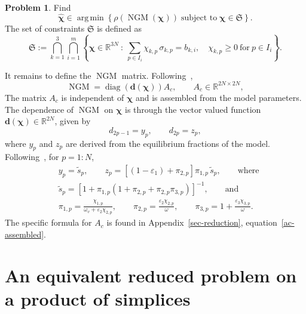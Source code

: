 \documentclass[11pt]{article}
\theoremstyle{plain}
\theoremstyle{definition}
\newtheorem{problem}[theorem]{Problem}
\theoremstyle{remark}
\numberwithin{equation}{section}
\numberwithin{figure}{section}
\numberwithin{table}{section}
\numberwithin{algorithm}{section}
\begin{document}
\begin{problem}\label{ngm-problem}
Find
\begin{equation}\label{the-min}
\widehat{\bm\chi}\in\operatorname*{arg\,min}\left\{\rho\left(\operatorname{NGM}(\bm\chi)\right)\;\mbox{subject to}\;\bm\chi\in\mathfrak{S}\right\}.
\end{equation}
The set of constraints $\mathfrak{S}$ is defined as
\begin{equation}\label{constraints}
\mathfrak{S}:=\bigcap_{k=1}^{3}\bigcap_{i=1}^{m}\left\{\bm\chi\in\mathbb{R}^{3N}\ :\
\sum_{p\in I_i}\chi_{k,p}\,\sigma_{k,p}=b_{k,i},\quad \chi_{k,p}\ge 0\ \mbox{for}\ p\in I_i\right\}.
\end{equation}
\end{problem}

It remains to define the $\operatorname{NGM}$ matrix.
Following~\cite{JZh},
\begin{equation}\label{ngm}
\operatorname{NGM}=\operatorname{diag}\left(\bm d(\bm\chi)\right)A_c,
\qquad A_c\in\mathbb{R}^{2N\times 2N},
\end{equation}
The matrix $A_c$ is independent of $\bm\chi$ and is assembled from the model parameters.
The dependence of $\operatorname{NGM}$ on $\bm\chi$ is through the vector
valued function $\bm d(\bm\chi)\in\mathbb{R}^{2N}$, given by
\begin{equation}\label{yz}
d_{2p-1}=y_p,\qquad d_{2p}=z_p,
\end{equation}
where $y_p$ and $z_p$ are derived from the equilibrium fractions of the
model. Following~\cite{JZh}, for $p=1:N$,
\begin{equation}\label{yz-def}
\begin{aligned}
&y_p=\widetilde s_p,\qquad
z_p=\left\lbrack(1-\varepsilon_1)+\pi_{2,p}\right\rbrack\pi_{1,p}\,\widetilde s_p,
\qquad\mbox{where}\\
&\widetilde s_p=\left\lbrack
1+\pi_{1,p}\left(1+\pi_{2,p}+\pi_{2,p}\pi_{3,p}\right)\right\rbrack^{-1},
\qquad\mbox{and}\\
&\pi_{1,p}=\frac{\chi_{1,p}}{\omega_v+\varepsilon_2\chi_{2,p}},\qquad
\pi_{2,p}=\frac{\varepsilon_2\chi_{2,p}}{\omega},\qquad
\pi_{3,p}=1+\frac{\varepsilon_3\chi_{3,p}}{\omega}.
\end{aligned}
\end{equation}
The specific formula for $A_c$ is found in Appendix~\ref{sec-reduction},
equation~\eqref{ac-assembled}.

\section{An equivalent reduced problem on a product of simplices}\label{sec-reduced}
\end{document}

